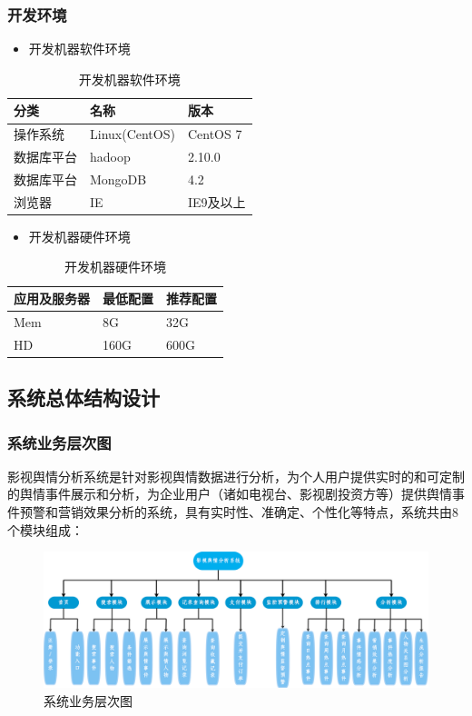 \subsubsection{开发环境}
\begin{itemize}
	\item 开发机器软件环境
\end{itemize}
\begin{table}[!htbp]
	\centering
	\caption{开发机器软件环境}
	\label{tab:my-table2}
	\begin{tabular}{|p{5cm}|p{4cm}|p{4cm}|}
		\hline
		分类 & 名称 & 版本 \\ \hline
		操作系统 & Linux(CentOS) & CentOS 7  \\ \hline
		数据库平台 & hadoop & 2.10.0  \\ \hline
		数据库平台 & MongoDB & 4.2  \\ \hline
		浏览器 & IE & IE9及以上  \\ \hline
	\end{tabular}
\end{table}
\begin{itemize}
	\item 开发机器硬件环境
\end{itemize}	
\begin{table}[!htbp]
	\centering
	\caption{开发机器硬件环境}
	\label{tab:my-table3}
	\begin{tabular}{|p{5cm}|p{4cm}|p{4cm}|}
		\hline
		应用及服务器 & 最低配置 & 推荐配置 \\ \hline
		Mem & 8G & 32G \\ \hline
		HD & 160G & 600G \\ \hline
	\end{tabular}
\end{table}

\subsection{系统总体结构设计}

\subsubsection{系统业务层次图}
影视舆情分析系统是针对影视舆情数据进行分析，为个人用户提供实时的和可定制的舆情事件展示和分析，为企业用户（诸如电视台、影视剧投资方等）提供舆情事件预警和营销效果分析的系统，具有实时性、准确定、个性化等特点，系统共由8个模块组成：
\begin{figure}[!htbp]
	\centering
	\includegraphics[scale=0.4]{image/o1.png}
	\caption{系统业务层次图}
\end{figure}



